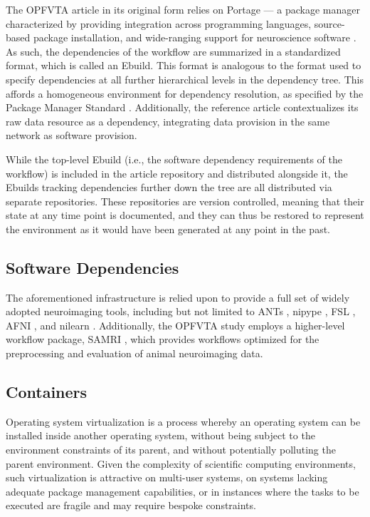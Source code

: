 The OPFVTA article in its original form relies on Portage \cite{portage} — a package manager characterized by providing integration across programming languages, source-based package installation, and wide-ranging support for neuroscience software \cite{ng}.
As such, the dependencies of the workflow are summarized in a standardized format, which is called an Ebuild.
This format is analogous to the format used to specify dependencies at all further hierarchical levels in the dependency tree.
This affords a homogeneous environment for dependency resolution, as specified by the Package Manager Standard \cite{pms}.
Additionally, the reference article contextualizes its raw data resource as a dependency, integrating data provision in the same network as software provision.

While the top-level Ebuild (i.e., the software dependency requirements of the workflow) is included in the article repository and distributed alongside it, the Ebuilds tracking dependencies further down the tree are all distributed via separate repositories.
These repositories are version controlled, meaning that their state at any time point is documented, and they can thus be restored to represent the environment as it would have been generated at any point in the past.


\subsection{Software Dependencies}

The aforementioned infrastructure is relied upon to provide a full set of widely adopted neuroimaging tools, including but not limited to ANTs \cite{ants}, nipype \cite{nipype}, FSL \cite{fsl}, AFNI \cite{afni}, and nilearn \cite{nilearn}.
Additionally, the OPFVTA study employs a higher-level workflow package, SAMRI \cite{samri,irsabi}, which provides workflows optimized for the preprocessing and evaluation of animal neuroimaging data.


\subsection{Containers}

Operating system virtualization is a process whereby an operating system can be installed inside another operating system, without being subject to the environment constraints of its parent, and without potentially polluting the parent environment.
Given the complexity of scientific computing environments, such virtualization is attractive on multi-user systems, on systems lacking adequate package management capabilities, or in instances where the tasks to be executed are fragile and may require bespoke constraints.

